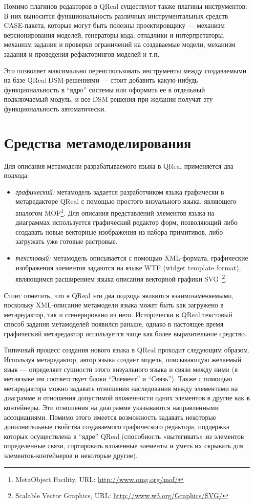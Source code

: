\documentclass[a4]{article}
\begin{document}
Помимо плагинов редакторов в QReal существуют также плагины инструментов. В них выносится функциональность различных инструментальных средств CASE-пакета, которые могут быть полезны проектировщику --- механизм версионирования моделей, генераторы кода, отладчики и интерпретаторы, механизм задания и проверки ограничений на создаваемые модели, механизм задания и проведения рефакторингов моделей и т.п. 

Это позволяет максимально переиспользовать инструменты между создаваемыми на базе QReal DSM-решениями --- стоит добавить какую-нибудь функциональность в ``ядро'' системы или оформить ее в отдельный подключаемый модуль, и все DSM-решения при желании получат эту функциональность автоматически. 

\section{Средства метамоделирования}

Для описания метамодели разрабатываемого языка в QReal применяется два подхода:
\begin{itemize}
 \item \textit{графический:} метамодель задается разработчиком языка графически в метаредакторе QReal с помощью простого визуального языка, являющего аналогом MOF\footnote{MetaObject Facility, URL: \url{http://www.omg.org/mof/}}. Для описания представлений элементов языка на диаграммах используется графический редактор форм, позволяющий либо создавать новые векторные изображения из набора примитивов, либо загружать уже готовые растровые.
 \item \textit{текстовый:} метамодель описывается с помощью XML-формата, графические изображения элементов задаются на языке WTF (widget template format), являющимся расширением языка описания векторной графики SVG~\footnote{Scalable Vector Graphics, URL: \url{http://www.w3.org/Graphics/SVG/}}.
\end{itemize}

Стоит отметить, что в QReal эти два подхода являются взаимозаменяемыми, поскольку XML-описание метамодели языка может быть как загружено в метаредактор, так и сгенерировано из него. Исторически в QReal текстовый способ задания метамоделей появился раньше, однако в настоящее время графический метаредактор используется чаще как более выразительное средство.

Типичный процесс создания нового языка в QReal проходит следующим образом. Используя метаредактор, автор языка создает модель, описывающую желаемый язык --- определяет сущности этого визуального языка и связи между ними (в метаязыке им соответствует блоки ``Элемент'' и ``Связь''). Также с помощью метаредактора можно задавать отношения наследования между элементами на диаграмме и отношения допустимой вложенности одних элементов в другие как в контейнеры. Эти отношения на диаграмме указываются направленными ассоциациями. Помимо этого имеется возможность задавать некоторые дополнительные свойства создаваемого графического редактора, поддержка которых осуществлена в “ядре” QReal (способность «вытягивать» из элементов определенные связи, сортировать вложенные элементы и уметь их скрывать для элементов-контейнеров и некоторые другие).
\end{document}
